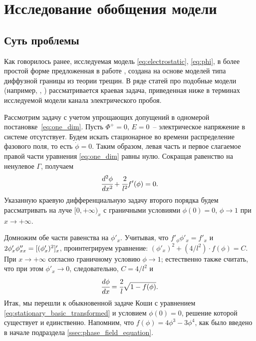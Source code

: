 
\section{Исследование обобщения модели}
\label{sec:generalized_model}

\subsection{Суть проблемы}
\label{ssec:matter_of_problem}

Как говорилось ранее, исследуемая модель \eqref{eq:electrostatic}, \eqref{eq:phi}, в более простой форме предложенная в работе \cite{pitike_dielectric_breakdown}, создана на основе моделей типа диффузной границы из теории трещин. В ряде статей про подобные модели (например, \cite{pitike_dielectric_breakdown}, \cite{sargado_phase_field}) рассматривается краевая задача, приведенная ниже в терминах исследуемой модели канала электрического пробоя.

Рассмотрим задачу с учетом упрощающих допущений в одномерой постановке~\eqref{eq:one_dim}. Пусть $\Phi^+ = 0$, $E = 0$~-- электрическое напряжение в системе отсутствует. Будем искать стационарное во времени распределение фазового поля, то есть $\dot{\phi} = 0$. Таким образом, левая часть и первое слагаемое правой части уравнения \eqref{eq:one_dim} равны нулю. Сокращая равенство на ненулевое $\Gamma$, получаем
\[
    \cfrac{d^2 \phi}{dx^2} + \cfrac{2}{l^2} f'(\phi) = 0.
\]
Указанную краевую дифференциальную задачу второго порядка будем рассматривать на луче $[0, +\infty)_x$ с граничными условиями $\phi(0) = 0$, $\phi \to 1$ при $x \to +\infty$.

Домножим обе части равенства на $\phi'_x$. Учитывая, что $f'_\phi \phi'_x = f'_x$ и $2 \phi'_x \phi''_{xx} \hm = [(\phi'_x)^2]'_x$, проинтегрируем уравнение: $(\phi'_x)^2 + (4 / l^2) \cdot f(\phi) = C$. При $x \to +\infty$ согласно граничному условию $\phi \to 1$; естественно также считать, что при этом $\phi'_x \to 0$, следовательно, $C = 4 / l^2$ и
\begin{equation}
    \cfrac{d \phi}{dx} = \cfrac{2}{l} \sqrt{1 - f(\phi)}.
    \label{eq:stationary_basic_transformed}
\end{equation}
Итак, мы перешли к обыкновенной задаче Коши с уравнением \eqref{eq:stationary_basic_transformed} и условием $\phi(0) = 0$, решение которой существует и единственно. Напомним, что $f(\phi) = 4 \phi^3 - 3 \phi^4$, как было введено в начале подраздела \ref{ssec:phase_field_equation}.

